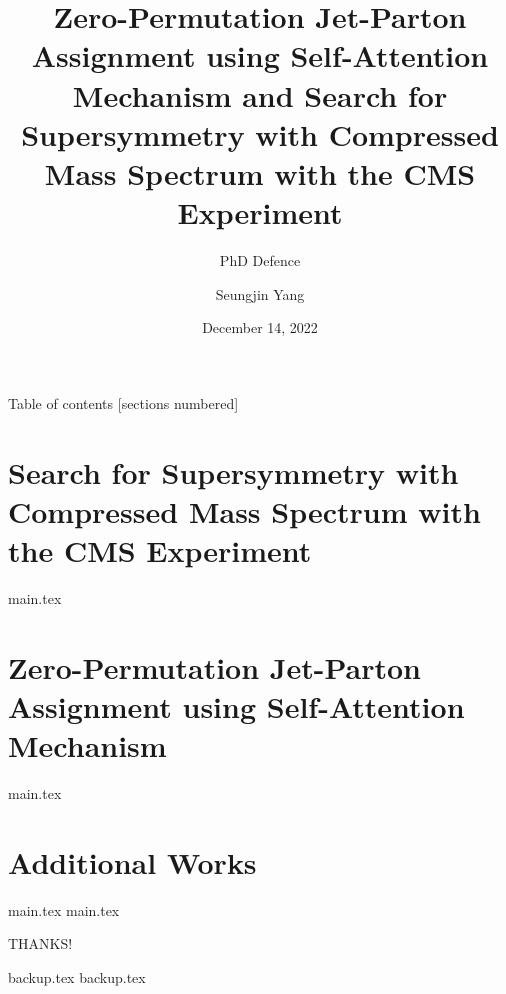 \documentclass[10pt]{beamer}
\title{Zero-Permutation Jet-Parton Assignment using Self-Attention Mechanism and Search for Supersymmetry with Compressed Mass Spectrum with the CMS Experiment}
\subtitle{PhD Defence}
\author{Seungjin Yang}
\institute[VFU]{University of Seoul}
\date{December 14, 2022}
\begin{document}
\begin{frame}
    \maketitle
\end{frame}

\begin{frame}{Table of contents}
  [sections numbered]
  \tableofcontents%
\end{frame}

\section{Search for Supersymmetry with Compressed Mass Spectrum with the CMS Experiment}
{main.tex}

\section{Zero-Permutation Jet-Parton Assignment using Self-Attention Mechanism}
{main.tex}

\section{Additional Works}
{main.tex}
{main.tex}

{
\begin{frame}[standout]
  THANKS!
\end{frame}
}

\appendix
{backup.tex}
{backup.tex}
\end{document}
